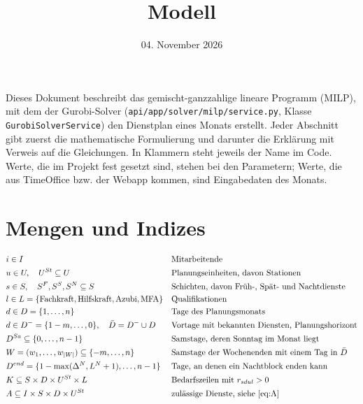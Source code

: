 \documentclass[11pt]{combiArticle}
\newcommand{\Dm}{D^{-}}
\newcommand{\Db}{\bar{D}}
\newcommand{\code}[1]{\texttt{#1}}
\begin{document}
\title{Modell}
\date{04. November 2026}
\maketitle

Dieses Dokument beschreibt das gemischt-ganzzahlige lineare Programm (MILP), mit dem der Gurobi-Solver
(\code{api/app/solver/milp/service.py}, Klasse \code{GurobiSolverService}) den Dienstplan eines Monats
erstellt. Jeder Abschnitt gibt zuerst die mathematische Formulierung und darunter die Erklärung mit Verweis
auf die Gleichungen. In Klammern steht jeweils der Name im Code. Werte, die im Projekt fest gesetzt sind,
stehen bei den Parametern; Werte, die aus TimeOffice bzw. der Webapp kommen, sind Eingabedaten des Monats.

\section{Mengen und Indizes}

\begin{align}
  & i \in I && \text{Mitarbeitende} \label{set:I}\\
  & u \in U,\quad U^{St} \subseteq U && \text{Planungseinheiten, davon Stationen} \label{set:U}\\
  & s \in S,\quad S^{F}, S^{S}, S^{N} \subseteq S && \text{Schichten, davon Früh-, Spät- und Nachtdienste} \label{set:S}\\
  & l \in L = \{\text{Fachkraft}, \text{Hilfskraft}, \text{Azubi}, \text{MFA}\} && \text{Qualifikationen} \label{set:L}\\
  & d \in D = \{1,\dots,n\} && \text{Tage des Planungsmonats} \label{set:D}\\
  & d \in \Dm = \{1-m,\dots,0\},\quad \Db = \Dm \cup D && \text{Vortage mit bekannten Diensten, Planungshorizont} \label{set:Dm}\\
  & D^{Sa} \subseteq \{0,\dots,n-1\} && \text{Samstage, deren Sonntag im Monat liegt} \label{set:DSa}\\
  & W = (w_1,\dots,w_{|W|}) \subseteq \{-m,\dots,n\} && \text{Samstage der Wochenenden mit einem Tag in } \Db \label{set:W}\\
  & D^{end} = \{1-\max(\Delta^N, L^N+1),\dots,n-1\} && \text{Tage, an denen ein Nachtblock enden kann} \label{set:Dend}\\
  & K \subseteq S \times D \times U^{St} \times L && \text{Bedarfszeilen mit } r_{sdul} > 0 \label{set:K}\\
  & A \subseteq I \times S \times D \times U^{St} && \text{zulässige Dienste, siehe \eqref{eq:A}} \label{set:A}
\end{align}
\end{document}
